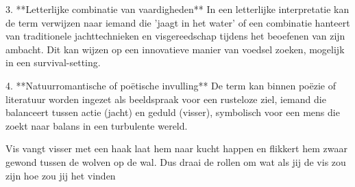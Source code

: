 3. **Letterlijke combinatie van vaardigheden**
In een letterlijke interpretatie kan de term verwijzen naar iemand die 'jaagt in het water' of een combinatie hanteert van traditionele jachttechnieken en visgereedschap tijdens het beoefenen van zijn ambacht. Dit kan wijzen op een innovatieve manier van voedsel zoeken, mogelijk in een survival-setting.

4. **Natuurromantische of poëtische invulling**
De term kan binnen poëzie of literatuur worden ingezet als beeldspraak voor een rusteloze ziel, iemand die balanceert tussen actie (jacht) en geduld (visser), symbolisch voor een mens die zoekt naar balans in een turbulente wereld.

Vis vangt visser met een haak laat hem naar kucht happen en flikkert hem zwaar gewond tussen de wolven op de wal. Dus draai de rollen om wat als jij de vis zou zijn hoe zou jij het vinden
